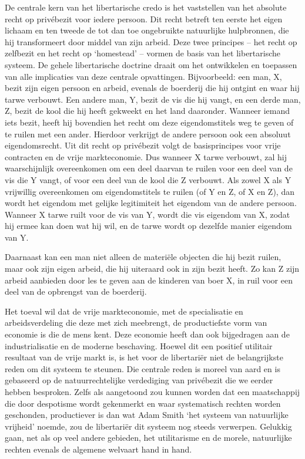 \documentclass[
  a5paper,
  smalldemyvopaper,10pt,twoside,onecolumn,openright,extrafontsizes,hidelinks]{memoir}
\begin{document}
De centrale kern van het libertarische credo is het vaststellen van het
absolute recht op privébezit voor iedere persoon. Dit recht betreft ten
eerste het eigen lichaam en ten tweede de tot dan toe ongebruikte
natuurlijke hulpbronnen, die hij transformeert door middel van zijn
arbeid. Deze twee principes -- het recht op zelfbezit en het recht op
`homestead' -- vormen de basis van het libertarische systeem. De gehele
libertarische doctrine draait om het ontwikkelen en toepassen van alle
implicaties van deze centrale opvattingen. Bijvoorbeeld: een man, X,
bezit zijn eigen persoon en arbeid, evenals de boerderij die hij ontgint
en waar hij tarwe verbouwt. Een andere man, Y, bezit de vis die hij
vangt, en een derde man, Z, bezit de kool die hij heeft gekweekt en het
land daaronder. Wanneer iemand iets bezit, heeft hij bovendien het recht
om deze eigendomstitels weg te geven of te ruilen met een ander.
Hierdoor verkrijgt de andere persoon ook een absoluut eigendomsrecht.
Uit dit recht op privébezit volgt de basisprincipes voor vrije
contracten en de vrije markteconomie. Dus wanneer X tarwe verbouwt, zal
hij waarschijnlijk overeenkomen om een deel daarvan te ruilen voor een
deel van de vis die Y vangt, of voor een deel van de kool die Z
verbouwt. Als zowel X als Y vrijwillig overeenkomen om eigendomstitels
te ruilen (of Y en Z, of X en Z), dan wordt het eigendom met gelijke
legitimiteit het eigendom van de andere persoon. Wanneer X tarwe ruilt
voor de vis van Y, wordt die vis eigendom van X, zodat hij ermee kan
doen wat hij wil, en de tarwe wordt op dezelfde manier eigendom van Y.

Daarnaast kan een man niet alleen de materiële objecten die hij bezit
ruilen, maar ook zijn eigen arbeid, die hij uiteraard ook in zijn bezit
heeft. Zo kan Z zijn arbeid aanbieden door les te geven aan de kinderen
van boer X, in ruil voor een deel van de opbrengst van de boerderij.

Het toeval wil dat de vrije markteconomie, met de specialisatie en
arbeidsverdeling die deze met zich meebrengt, de productiefste vorm van
economie is die de mens kent. Deze economie heeft dan ook bijgedragen
aan de industrialisatie en de moderne beschaving. Hoewel dit een
positief utilitair resultaat van de vrije markt is, is het voor de
libertariër niet de belangrijkste reden om dit systeem te steunen. Die
centrale reden is moreel van aard en is gebaseerd op de
natuurrechtelijke verdediging van privébezit die we eerder hebben
besproken. Zelfs als aangetoond zou kunnen worden dat een maatschappij
die door despotisme wordt gekenmerkt en waar systematisch rechten worden
geschonden, productiever is dan wat Adam Smith `het systeem van
natuurlijke vrijheid' noemde, zou de libertariër dit systeem nog steeds
verwerpen. Gelukkig gaan, net als op veel andere gebieden, het
utilitarisme en de morele, natuurlijke rechten evenals de algemene
welvaart hand in hand.
\end{document}
